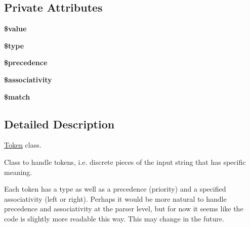 \subsection*{Private Attributes}
\begin{DoxyCompactItemize}
\item 
\hypertarget{classMathParser_1_1Lexing_1_1Token_ab38ab1ba987fcec7c3a9756ee867ee8a}{{\bfseries \$value}}\label{classMathParser_1_1Lexing_1_1Token_ab38ab1ba987fcec7c3a9756ee867ee8a}

\item 
\hypertarget{classMathParser_1_1Lexing_1_1Token_ac0bdf919e48920230f167b33d64d645f}{{\bfseries \$type}}\label{classMathParser_1_1Lexing_1_1Token_ac0bdf919e48920230f167b33d64d645f}

\item 
\hypertarget{classMathParser_1_1Lexing_1_1Token_abff30dfcb17ec3614e804e781f37d144}{{\bfseries \$precedence}}\label{classMathParser_1_1Lexing_1_1Token_abff30dfcb17ec3614e804e781f37d144}

\item 
\hypertarget{classMathParser_1_1Lexing_1_1Token_aabe062c3d8c3941dda6edd70ace7d925}{{\bfseries \$associativity}}\label{classMathParser_1_1Lexing_1_1Token_aabe062c3d8c3941dda6edd70ace7d925}

\item 
\hypertarget{classMathParser_1_1Lexing_1_1Token_ad46b5fb6088bc2252d7af6ede3426113}{{\bfseries \$match}}\label{classMathParser_1_1Lexing_1_1Token_ad46b5fb6088bc2252d7af6ede3426113}

\end{DoxyCompactItemize}


\subsection{Detailed Description}
\hyperlink{classMathParser_1_1Lexing_1_1Token}{Token} class. 

Class to handle tokens, i.\-e. discrete pieces of the input string that has specific meaning.

Each token has a type as well as a precedence (priority) and a specified associativity (left or right). Perhaps it would be more natural to handle precedence and associativity at the parser level, but for now it seems like the code is slightly more readable this way. This may change in the future. 

